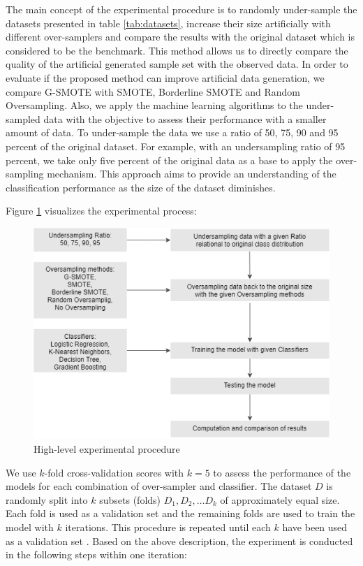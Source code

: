 \documentclass[parskip=full]{scrartcl}
\begin{document}
The main concept of the experimental procedure is to randomly under-sample the
datasets presented in table \ref{tab:datasets}, increase their size artificially with
different over-samplers and compare the results with the original dataset which
is considered to be the benchmark. This method allows us to directly compare the
quality of the artificial generated sample set with the observed data. In order
to evaluate if the proposed method can improve artificial data generation, we
compare G-SMOTE with SMOTE, Borderline SMOTE and Random Oversampling. Also, we
apply the machine learning algorithms to the under-sampled data with the
objective to assess their performance with a smaller amount of data. To
under-sample the data we use a ratio of 50, 75, 90 and 95 percent of the
original dataset. For example, with an undersampling ratio of 95 percent, we
take only five percent of the original data as a base to apply the over-sampling
mechanism. This approach aims to provide an understanding of the classification
performance as the size of the dataset diminishes.

Figure \ref{fig:experimentalprocedure} visualizes the experimental process: 

\begin{figure}[H]
	\centering
	\includegraphics[width=0.7\linewidth]{../analysis/experimental_procedure.png}
	\caption{High-level experimental procedure}
	\label{fig:experimentalprocedure}
\end{figure}

We use \( k \)-fold cross-validation scores with \( k = 5 \) to assess the
performance of the models for each combination of over-sampler and classifier.
The dataset \( D \) is randomly split into \( k \) subsets (folds) \( D_1, D_2,
… D_k \) of approximately equal size. Each fold is used as a validation set and
the remaining folds are used to train the model with \( k \) iterations. This
procedure is repeated until each \( k \) have been used as a validation set
\cite{Han.2012}. Based on the above description, the experiment is conducted in
the following steps within one iteration:
\end{document}
